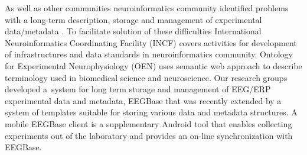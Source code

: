 \documentclass[a4paper,twoside]{article}
\begin{document}
As well as other communities neuroinformatics community identified problems with a long-term description, storage and management of experimental data/metadata \cite{CRCNS}. To facilitate solution of these difficulties International Neuroinformatics Coordinating Facility (INCF) \cite{incf} covers activities for development of infrastructures and data standards in neuroinformatics community. Ontology for Experimental Neurophysiology (OEN) \cite{10.3389/conf.fninf.2014.18.00044} uses semantic web approach to describe terminology used in biomedical science and neuroscience. Our research groups developed a~system for long term storage and management of EEG/ERP experimental data and metadata, EEGBase \cite{ISI:000306821100004} that was recently extended by a system of templates suitable for storing various data and metadata structures. A mobile EEGBase client \cite{10.3389/conf.fninf.2013.09.00046} is a supplementary Android tool that enables collecting experiments out of the laboratory and provides an on-line synchronization with EEGBase.
\end{document}
